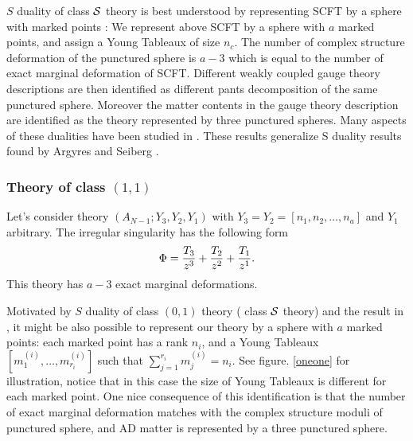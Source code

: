 \documentclass[a4paper,11pt]{article}
\begin{document}
$S$ duality of class ${\cal S}$ theory is best understood by representing SCFT by a sphere with marked points \cite{Gaiotto:2009we}: We represent above SCFT by a sphere 
with $a$ marked points, and assign a Young Tableaux of size $n_c$. The number of complex structure deformation of the punctured sphere is $a-3$ which is equal to the number of exact marginal 
deformation of  SCFT.  Different weakly coupled gauge theory descriptions are then identified as different pants decomposition of the same punctured sphere.
Moreover the matter contents in the gauge theory description are identified as the theory represented by three punctured spheres. Many aspects of these dualities have been studied in \cite{Gaiotto:2009hg,Tachikawa:2009rb,Nanopoulos:2009xe, Nanopoulos:2010ga,Chacaltana:2010ks,Tachikawa:2010vg,
Chacaltana:2011ze, Chacaltana:2012ch,Chacaltana:2013oka,Chacaltana:2014jba,Chacaltana:2014nya,Chacaltana:2015bna}. These results generalize S duality results found by Argyres and Seiberg \cite{Argyres:2007cn,Argyres:2007tq,Argyres:2010py}.









\subsubsection{Theory of class $(1,1)$}
Let's consider theory  $(A_{N-1};Y_3, Y_2, Y_1)$ with $Y_3=Y_2=[n_1, n_2,\ldots, n_a]$ and $Y_1$ arbitrary.  
The irregular singularity has the following form
\begin{equation}
\Phi={T_3\over z^3}+{T_2\over z^2}+{T_1\over z^1}.
\end{equation}
This theory has $a-3$ exact marginal deformations.  

Motivated by  $S$ duality of class $(0,1)$ theory ( class ${\cal S}$ theory) and the result in \cite{Xie:2016uqq},
it might be also possible to represent our theory by a sphere with $a$ marked points: each marked point  has a rank $n_i$, and  a Young Tableaux $[m_1^{(i)}, \ldots, m_{r_i}^{(i)}]$ such 
that $\sum_{j=1}^{r_i} m_j^{(i)}=n_i$.  See figure. \ref{oneone} for illustration, notice that in this case the size of Young Tableaux is different for each marked point. 
 One nice consequence of this identification is that the number of exact marginal deformation matches with 
the complex structure moduli of punctured sphere, and  AD matter is represented by a three punctured sphere. 
\end{document}
